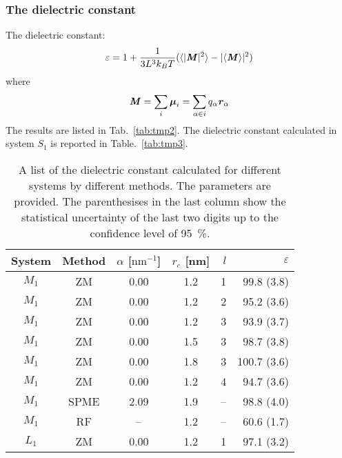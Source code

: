 \documentclass[aip,jcp,a4paper,reprint,unsortedaddress,onecolumn,fleqn]{revtex4-1}
\newcommand{\eps}{\varepsilon}
\newcommand{\vect}[1]{\textbf{\textit{#1}}}
\newcommand{\systemsb}{S_1}
\newcommand{\systemmb}{M_1}
\newcommand{\systemlb}{L_1}
\begin{document}
\subsubsection{The dielectric constant}

The dielectric constant:
\begin{align}
  \eps = 1 + \frac{1}{3L^3 k_BT} ( \langle \vert \vect M\vert^2\rangle - \vert\langle \vect M\rangle\vert^2 )
\end{align}
where
\begin{align}
  \vect M = \sum_i\boldsymbol\mu_i = \sum_{\alpha\in i} q_\alpha\vect r_\alpha
\end{align}
The results are listed in Tab.~\ref{tab:tmp2}. The dielectric constant calculated in system $\systemsb$ is reported in Table.~\ref{tab:tmp3}.

\begin{table}
  \centering
  \caption{A list of the dielectric constant calculated for different systems by different methods.
    The parameters are provided. The parenthesises in the last column show the statistical uncertainty
    of the last two digits up to the confidence level of 95~\%.}
  \begin{tabular*}{0.5\textwidth}{@{\extracolsep{\fill}}cccc rr}\hline\hline
    System & Method      &       $\alpha$ [$\textrm{nm}^{-1}$] & $r_c$ [nm] &    $l$     &       $\eps$ \\\hline
    $\systemmb$  &       ZM          &       0.00    &       1.2     &       1       &       99.8 (3.8)\\ 
    $\systemmb$  &       ZM          &       0.00    &       1.2     &       2       &       95.2 (3.6)\\ 
    $\systemmb$  &       ZM          &       0.00    &       1.2     &       3       &       93.9 (3.7)\\ 
    $\systemmb$  &       ZM          &       0.00    &       1.5     &       3       &       98.7 (3.8)\\ 
    $\systemmb$  &       ZM          &       0.00    &       1.8     &       3       &      100.7 (3.6)\\ 
    $\systemmb$  &       ZM          &       0.00    &       1.2     &       4       &       94.7 (3.6)\\
    $\systemmb$   & SPME          & 2.09  & 1.9   &       --      &       98.8 (4.0) \\
    $\systemmb$  & RF             & --  & 1.2 & -- & 60.6   (1.7) \\
    $\systemlb$  &       ZM          &       0.00    &       1.2     &       1       &       97.1 (3.2)\\ 

\end{tabular*}
\end{table}
\end{document}
